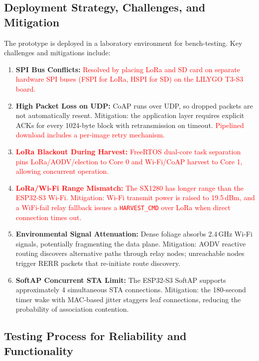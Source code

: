 \documentclass[12pt,a4paper]{article}
\DeclareRobustCommand{\changed}[1]{\textcolor{red}{#1}}
\begin{document}
\subsection{Deployment Strategy, Challenges, and Mitigation}

The prototype is deployed in a laboratory environment for bench-testing. Key challenges and mitigations include:

\begin{enumerate}
    \item \textbf{SPI Bus Conflicts:} \changed{Resolved by placing LoRa and SD card on separate hardware SPI buses (FSPI for LoRa, HSPI for SD) on the LILYGO T3-S3 board.}

    \item \textbf{High Packet Loss on UDP:} CoAP runs over UDP, so dropped packets are not automatically resent. Mitigation: the application layer requires explicit ACKs for every 1024-byte block with retransmission on timeout. \changed{Pipelined download includes a per-image retry mechanism.}

    \item \changed{\textbf{LoRa Blackout During Harvest:} FreeRTOS dual-core task separation pins LoRa/AODV/election to Core 0 and Wi-Fi/CoAP harvest to Core 1, allowing concurrent operation.}

    \item \changed{\textbf{LoRa/Wi-Fi Range Mismatch:} The SX1280 has longer range than the ESP32-S3 Wi-Fi. Mitigation: Wi-Fi transmit power is raised to 19.5\,dBm, and a WiFi-fail relay fallback issues a \texttt{HARVEST\_CMD} over LoRa when direct connection times out.}

    \item \textbf{Environmental Signal Attenuation:} Dense foliage absorbs 2.4\,GHz Wi-Fi signals, potentially fragmenting the data plane. Mitigation: AODV reactive routing discovers alternative paths through relay nodes; unreachable nodes trigger RERR packets that re-initiate route discovery.

    \item \textbf{SoftAP Concurrent STA Limit:} The ESP32-S3 SoftAP supports approximately 4 simultaneous STA connections. Mitigation: the 180-second timer wake with MAC-based jitter staggers leaf connections, reducing the probability of association contention.
\end{enumerate}

\subsection{Testing Process for Reliability and Functionality}
\end{document}
